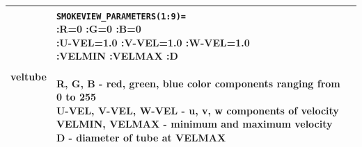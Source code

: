 \begin{longtable}[ht]{|l|l|c|}
veltube&
\parbox[c]{\boxwidth}{
{\tt SMOKEVIEW\_PARAMETERS(1:9)=}\\
:R=0 :G=0 :B=0 \\
:U-VEL=1.0 :V-VEL=1.0 :W-VEL=1.0  \\
:VELMIN :VELMAX :D \\  \\
R, G, B - red, green, blue color components ranging from 0 to 255\\
U-VEL, V-VEL, W-VEL - u, v, w components of velocity\\
VELMIN, VELMAX - minimum and maximum velocity\\
D - diameter of tube at VELMAX
} &
 \\ \hline
\end{longtable}
